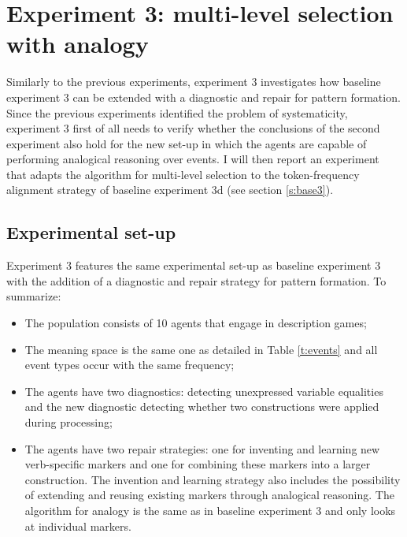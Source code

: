 \section{Experiment 3: multi-level selection with analogy}
\label{s:pattern-exp-3}

Similarly to the previous experiments, experiment 3 investigates how baseline experiment 3 can be extended with a diagnostic and repair for pattern formation. Since the previous experiments identified the problem of systematicity, experiment 3 first of all needs to verify whether the conclusions of the second experiment also hold for the new set-up in which the agents are capable of performing analogical reasoning over events. I will then report an experiment that adapts the algorithm for multi-level selection to the token-frequency alignment strategy of baseline experiment 3d (see section \ref{s:base3}).

\subsection{Experimental set-up}

Experiment 3 features the same experimental set-up as baseline experiment 3 with the addition of a diagnostic and repair strategy for pattern formation. To summarize:

\begin{itemize}
\item The population consists of 10 agents that engage in description games;
\item The meaning space is the same one as detailed in Table \ref{t:events} and all event types occur with the same frequency;
\item The agents have two diagnostics: detecting unexpressed variable equalities and the new diagnostic detecting whether two constructions were applied during processing;
\item The agents have two repair strategies: one for inventing and learning new verb-specific markers and one for combining these markers into a larger construction. The invention and learning strategy also includes the possibility of extending and reusing existing markers through analogical reasoning. The algorithm for analogy is the same as in baseline experiment 3 and only looks at individual markers.
\end{itemize}

